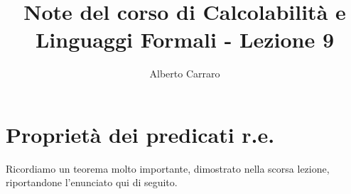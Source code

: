 \documentclass[runningheads,a4paper]{llncs}
\begin{document}
\mainmatter  %

\title{Note del corso di Calcolabilit\`{a} e Linguaggi Formali - Lezione 9}


%
%
\author{Alberto Carraro}
%


%
%




\maketitle

\section{Propriet\`{a} dei predicati r.e.}

Ricordiamo un teorema molto importante, dimostrato nella scorsa lezione, riportandone l'enunciato qui di seguito.
\end{document}
